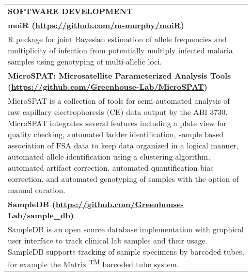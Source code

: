 \begin{center}
    \begin{tabularx}{\textwidth}{X}
        {\large \textbf{SOFTWARE DEVELOPMENT}} \\
        \small \textbf{moiR (\href{https://github.com/m-murphy/moiR}{https://github.com/m-murphy/moiR})} \\
        \small R package for joint Bayesian estimation of allele frequencies and multiplicity of infection from potentially multiply infected malaria samples using genotyping of multi-allelic loci. \\
        \small \textbf{MicroSPAT: Microsatellite Parameterized Analysis Tools (\href{https://github.com/Greenhouse-Lab/MicroSPAT}{https://github.com/Greenhouse-Lab/MicroSPAT})} \\
        \small MicroSPAT is a collection of tools for semi-automated analysis of raw capillary electrophoresis (CE) data output by the ABI 3730. MicroSPAT integrates several features including a plate view for quality checking, automated ladder identification, sample based association of FSA data to keep data organized in a logical manner, automated allele identification using a clustering algorithm, automated artifact correction, automated quantification bias correction, and automated genotyping of samples with the option of manual curation. \\
        \small \textbf{SampleDB (\href{https://github.com/Greenhouse-Lab/sample_db}{https://github.com/Greenhouse-Lab/sample\_db})} \\
        \small SampleDB is an open source database implementation with graphical user interface to track clinical lab samples and their usage. SampleDB supports tracking of sample specimens by barcoded tubes, for example the Matrix \textsuperscript{TM} barcoded tube system. \\
    \end{tabularx}
\end{center}